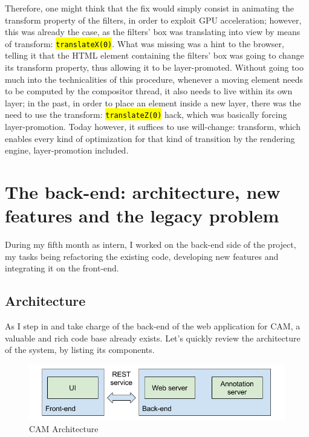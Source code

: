 \documentclass[12pt,oneside,svgnames]{memoir}
\let\OldTexttt\texttt
\renewcommand{\texttt}[1]{\OldTexttt{\hl{#1}}}
\begin{document}
Therefore, one might think that the fix would simply consist in
animating the transform property of the filters, in order to exploit GPU
acceleration; however, this was already the case, as the filters' box
was translating into view by means of transform: \texttt{translateX(0)}.
What was missing was a hint to the browser, telling it that the HTML
element containing the filters' box was going to change its transform
property, thus allowing it to be layer-promoted. Without going too much
into the technicalities of this procedure, whenever a moving element
needs to be computed by the compositor thread, it also needs to live
within its own layer; in the past, in order to place an element inside a
new layer, there was the need to use the transform:
\texttt{translateZ(0)} hack, which was basically forcing
layer-promotion. Today however, it suffices to use will-change:
transform, which enables every kind of optimization for that kind of
transition by the rendering engine, layer-promotion included.

\chapter{The back-end: architecture, new features and the legacy
problem}\label{the-back-end-architecture-new-features-and-the-legacy-problem}

During my fifth month as intern, I worked on the back-end side of the
project, my tasks being refactoring the existing code, developing new
features and integrating it on the front-end.

\section{Architecture}\label{architecture}

As I step in and take charge of the back-end of the web application for
CAM, a valuable and rich code base already exists. Let's quickly review
the architecture of the system, by listing its components.

\begin{figure}[htbp]
\centering
\includegraphics{./src/img/architecture.png}
\caption{CAM Architecture}
\end{figure}
\end{document}
